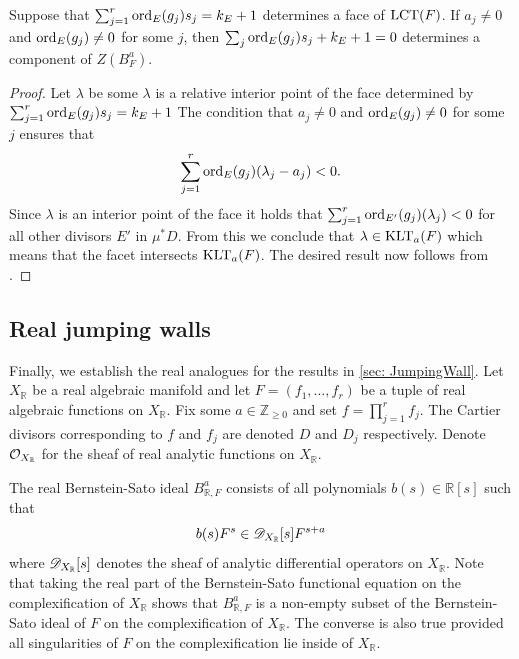 \begin{corollary}\label{cor: LCT}
  Suppose that $\sum_{j=1}^r \operatorname{ord}_E(g_j)s_j = k_E + 1$ determines a face of $\operatorname{LCT}(F)$.
  If $a_j\neq 0$ and $\operatorname{ord}_{E}(g_j)\neq 0$ for some $j$, then $\sum_j \operatorname{ord}_{E}(g_j)s_j +k_E + 1=0$ determines a component of $Z(B_F^a)$.
\end{corollary}
\begin{proof}
  Let $\lambda$ be some $\lambda$ is a relative interior point of the face determined by $\sum_{j=1}^r \operatorname{ord}_E(g_j)s_j = k_E + 1$
  The condition that $a_j\neq 0$ and $\operatorname{ord}_{E}(g_j)\neq 0$ for some $j$ ensures that
  $$\sum_{j=1}^r \operatorname{ord}_{E}(g_j)(\lambda_j - a_j) < 0. $$
  Since $\lambda$ is an interior point of the face it holds that $\sum_{j=1}^r \operatorname{ord}_{E'}(g_j)(\lambda_j) < 0$ for all other divisors $E'$ in $\mu^*D$.
  From this we conclude that $\lambda \in \operatorname{KLT}_a(F)$ which means that the facet intersects $\operatorname{KLT}_a(F)$.
  The desired result now follows from .
\end{proof}
\subsection{Real jumping walls}\label{sec: RealJump}
Finally, we establish the real analogues for the results in \cref{sec: JumpingWall}.
Let $X_\mathbb{R}$ be a real algebraic manifold and let $F = (f_1,\ldots,f_r)$ be a tuple of real algebraic functions on $X_{\mathbb{R}}$.
Fix some $a\in \mathbb{Z}_{\geq 0}$ and set $f = \prod_{j=1}^r f_j$.
The Cartier divisors corresponding to $f$ and $f_j$ are denoted $D$ and $D_j$ respectively.
Denote $\mathcal{O}_{X_\mathbb{R}}$ for the sheaf of real analytic functions on $X_\mathbb{R}$.

The real Bernstein-Sato ideal $B_{\mathbb{R},F}^a$ consists of all polynomials $b(s)\in \mathbb{R}[s]$ such that
$$b(s)F^s \in \mathscr{D}_{X_\mathbb{R}}[s]F^{s+a}$$
where $\mathscr{D}_{X_\mathbb{R}}[s]$ denotes the sheaf of analytic differential operators on $X_\mathbb{R}$.
Note that taking the real part of the Bernstein-Sato functional equation on the complexification of $X_\mathbb{R}$ shows that $B_{\mathbb{R},F}^a$ is a non-empty subset of the Bernstein-Sato ideal of $F$ on the complexification of $X_\mathbb{R}$.
The converse is also true provided all singularities of $F$ on the complexification lie inside of $X_\mathbb{R}$.

